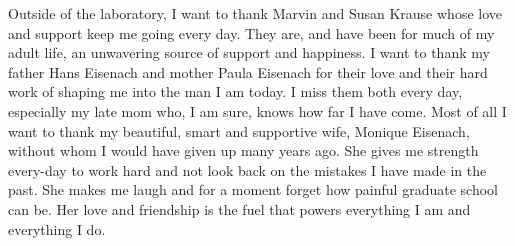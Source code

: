 Outside of the laboratory, I want to thank Marvin and Susan Krause whose love and support keep me going every day. They are, and have been for much of my adult life, an unwavering source of support and happiness. I want to thank my father Hans Eisenach and mother Paula Eisenach for their love and their hard work of shaping me into the man I am today. I miss them both every day, especially my late mom who, I am sure, knows how far I have come. Most of all I want to thank my beautiful, smart and supportive wife, Monique Eisenach, without whom I would have given up many years ago. She gives me strength every-day to work hard and not look back on the mistakes I have made in the past. She makes me laugh and for a moment forget how painful graduate school can be. Her love and friendship is the fuel that powers everything I am and everything I do.


